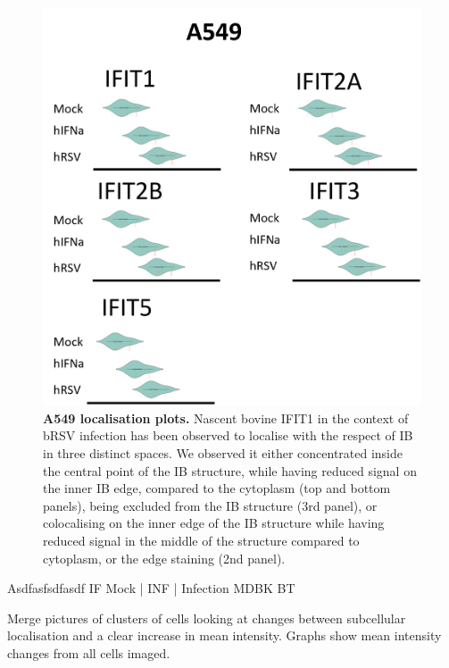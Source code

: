 \begin{figure}
    \centering
    \includegraphics[width=1\linewidth]{09. Chapter 4/Figs/01. Localisation introduction/07. a549 plots.png}
    \caption[A549 localisation plots.]{\textbf{A549 localisation plots.} Nascent bovine IFIT1 in the context of bRSV infection has been observed to localise with the respect of IB in three distinct spaces. We observed it either concentrated inside the central point of the IB structure, while having reduced signal on the inner IB edge, compared to the cytoplasm (top and bottom panels), being excluded from the IB structure (3rd panel), or colocalising on the inner edge of the IB structure while having reduced signal in the middle of the structure compared to cytoplasm, or the edge staining (2nd panel).}
    \label{fig:A549 localisation plots.}
\end{figure}


Asdfasfsdfasdf \newline
IF Mock | INF | Infection \newline
MDBK BT

Merge pictures of clusters of cells looking at changes between subcellular localisation and a clear increase in mean intensity. Graphs show mean intensity changes from all cells imaged.

